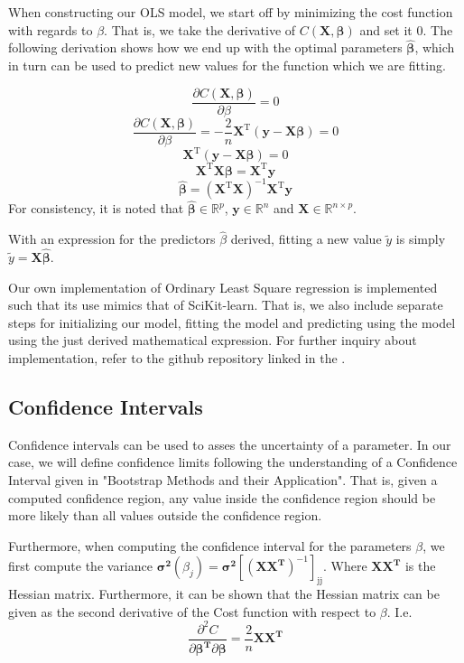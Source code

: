 \documentclass[11pt, a4paper]{article}
\begin{document}
When constructing our OLS model, we start off by minimizing the cost function with regards to $\beta$. That is, we take the derivative of $C(\bm{X},\bm{\beta})$ and set it $0$. The following derivation shows how we end up with the optimal parameters $\bm{\hat{\beta}}$, which in turn can be used to predict new values for the function which we are fitting.

\[
  \frac{\partial{C(\boldsymbol{X},\boldsymbol{\beta})}}{\partial{\beta}} = 0
\]
\[
  \frac{\partial{C(\boldsymbol{X},\boldsymbol{\beta})}}{\partial{\beta}} = -\frac{2}{n}\bm{X}^\text{T}\left(\bm{y} - \bm{X}\bm{\beta}\right) = 0
\]
\[
  \bm{X}^\text{T}\left(\bm{y} - \bm{X}\bm{\beta}\right) = 0
\]
\[
  \bm{X}^\text{T}\bm{X}\bm{\beta} = \bm{X}^\text{T}\bm{y}
\]
\[
  \bm{\hat{\beta}} = \left(\bm{X}^\text{T}\bm{X}\right)^{-1}\bm{X}^\text{T}\bm{y}
\]
For consistency, it is noted that $\bm{\hat{\beta}} \in \mathbb{R}^p$, $\bm{y} \in \mathbb{R}^n$ and $\bm{X} \in \mathbb{R}^{n\times{p}}$.

With an expression for the predictors $\hat{\beta}$ derived, fitting a new value $\tilde{y}$ is simply $\tilde{y} = \bm{X}\bm{\hat{\beta}}$.

Our own implementation of Ordinary Least Square regression is implemented such that its use mimics that of SciKit-learn. \cite{scikit-learn} That is, we also include separate steps for initializing our model, fitting the model and predicting using the model using the just derived mathematical expression. For further inquiry about implementation, refer to the github repository linked in the .

\subsection*{Confidence Intervals}
Confidence intervals can be used to asses the uncertainty of a parameter. In our case, we will define confidence limits following the understanding of a Confidence Interval given in "Bootstrap Methods and their Application". That is, given a computed confidence region, any value inside the confidence region should be more likely than all values outside the confidence region. \cite{Davison1997}

Furthermore, when computing the confidence interval for the parameters $\beta$, we first compute the variance $\bm{\sigma^2}(\beta_j) = \bm{\sigma^2}\left[(\bm{X}\bm{X^\text{T}})^{-1}\right]_\text{jj}$. Where $\bm{X}\bm{X^\text{T}}$ is the Hessian matrix. Furthermore, it can be shown that the Hessian matrix can be given as the second derivative of the Cost function with respect to $\beta$. I.e.
\[
  \frac{\partial^2C}{\partial{\bm{\beta^\text{T}}}\partial{\bm{\beta}}} = \frac{2}{n}\bm{X}\bm{X^\text{T}}
\]
\end{document}
